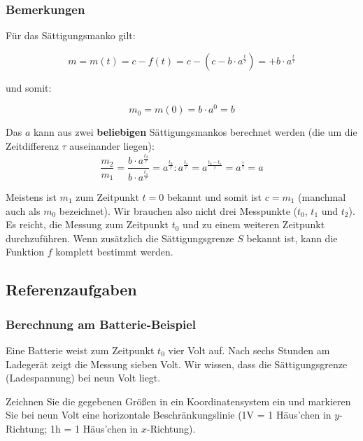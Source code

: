 \subsubsection{Bemerkungen}
\begin{bemerkung}{}{}
  Für das Sättigungsmanko gilt:

$$m = m(t) = c - f(t) = c - \left(c-b\cdot{}a^{\frac{t}{\tau}}\right) = + b\cdot{}a^{\frac{t}{\tau}}$$

und somit:

$$m_0 = m(0) = b\cdot{}a^0 = b$$
\end{bemerkung}

\begin{bemerkung}{}{}
Das $a$ kann aus zwei \textbf{beliebigen} Sättigungsmankos berechnet werden (die um die
Zeitdifferenz $\tau$ auseinander liegen):
$$\frac{m_2}{m_1} = \frac{b\cdot{}a^{\frac{t_2}{\tau}}}{b\cdot{}
  a^{\frac{t_1}{\tau}}} = a^{\frac{t_2}{\tau}} : a^{\frac{t_1}{\tau}} =
a^{\frac{t_2-t_1}{\tau}} = a^{\frac{\tau}{\tau}} = a$$
\end{bemerkung}


\begin{bemerkung}{}{}
Meistens ist $m_1$ zum Zeitpunkt $t=0$ bekannt und somit ist $c=m_1$ (manchmal auch als $m_0$ bezeichnet). Wir brauchen also nicht drei Messpunkte ($t_0$, $t_1$ und $t_2$). Es reicht, die Messung zum Zeitpunkt $t_0$ und zu einem weiteren Zeitpunkt durchzuführen. Wenn zusätzlich die Sättigungsgrenze $S$ bekannt ist, kann die Funktion $f$ komplett bestimmt werden.
\end{bemerkung}
\newpage

\subsection{Referenzaufgaben}

\subsubsection{Berechnung am Batterie-Beispiel}
Eine Batterie weist zum Zeitpunkt $t_0$ vier Volt auf. Nach sechs Stunden am Ladegerät zeigt die Messung sieben Volt. Wir wissen, dass die Sättigungsgrenze (Ladespannung) bei neun Volt liegt.

Zeichnen Sie die gegebenen Größen in ein Koordinatensystem ein und markieren Sie bei neun Volt eine horizontale Beschränkungslinie (\zB 1V = 1 Häus'chen in $y$-Richtung; 1h = 1 Häus'chen in $x$-Richtung).



